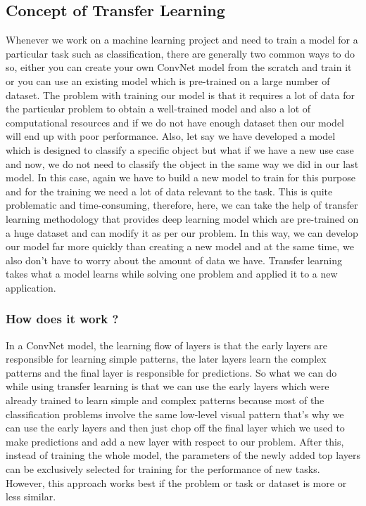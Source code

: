 \subsection{Concept of Transfer Learning}
Whenever we work on a machine learning project and need to train a model for a particular task such as classification, there are generally two common ways to do so, either you can create your own ConvNet model from the scratch and train it or you can use an existing model which is pre-trained on a large number of dataset. The problem with training our model is that it requires a lot of data for the particular problem to obtain a well-trained model and also a lot of computational resources and if we do not have enough dataset then our model will end up with poor performance. Also, let say we have developed a model which is designed to classify a specific object but what if we have a new use case and now, we do not need to classify the object in the same way we did in our last model. In this case, again we have to build a new model to train for this purpose and for the training we need a lot of data relevant to the task. This is quite problematic and time-consuming, therefore, here, we can take the help of transfer learning methodology that provides deep learning model which are pre-trained on a huge dataset and can modify it as per our problem. In this way, we can develop our model far more quickly than creating a new model and at the same time, we also don't have to worry about the amount of data we have. Transfer learning takes what a model learns while solving one problem and applied it to a new application.
\subsubsection{How does it work ?}
In a ConvNet model, the learning flow of layers is that the early layers are responsible for learning simple patterns, the later layers learn the complex patterns and the final layer is responsible for predictions. So what we can do while using transfer learning is that we can use the early layers which were already trained to learn simple and complex patterns because most of the classification problems involve the same low-level visual pattern that's why we can use the early layers and then just chop off the final layer which we used to make predictions and add a new layer with respect to our problem. After this, instead of training the whole model, the parameters of the newly added top layers can be exclusively selected for training for the performance of new tasks. However, this approach works best if the problem or task or dataset is more or less similar.
